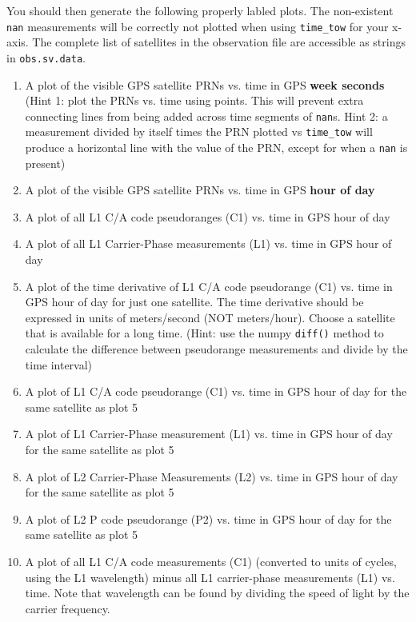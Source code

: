 \documentclass[12pt]{article}
\begin{document}
You should then generate the following properly labled plots.  The non-existent \lstinline{nan} measurements
will be correctly not plotted when using \lstinline{time_tow} for your x-axis.  The complete list
of satellites in the observation file are accessible as strings in \lstinline{obs.sv.data}.


\begin{enumerate}
   \item A plot of the visible GPS satellite PRNs vs. time in GPS \textbf{week seconds}
      (Hint 1: plot the PRNs vs. time using points.  This will prevent extra connecting lines
     from being added across time segments of \lstinline{nan}s.  Hint 2: a measurement divided by 
     itself times the PRN plotted vs \lstinline{time_tow} will produce a horizontal line with the value of
    the PRN, except for when a \lstinline{nan} is present)
   \item A plot of the visible GPS satellite PRNs vs. time in GPS \textbf{hour of day}
   \item A plot of all L1 C/A code pseudoranges (C1) vs. time in GPS hour of day
   \item A plot of all L1 Carrier-Phase measurements (L1) vs. time in GPS hour
      of day
   \item A plot of the time derivative of L1 C/A code pseudorange (C1) vs. time
      in GPS hour of day for just one satellite.  The time derivative should be
      expressed in units of meters/second (NOT meters/hour).  Choose a satellite
      that is available for a long time.  (Hint: use the numpy \lstinline{diff()} method
      to calculate the difference between pseudorange measurements and divide by the time interval)
   \item A plot of L1 C/A code pseudorange (C1) vs. time in GPS hour of day for
      the same satellite as plot 5
   \item A plot of L1 Carrier-Phase measurement (L1) vs. time in GPS hour of day
      for the same satellite as plot 5
   \item A plot of L2 Carrier-Phase Measurements (L2) vs. time in GPS hour of
      day for the same satellite as plot 5
   \item A plot of L2 P code pseudorange (P2) vs. time in GPS hour of day for
      the same satellite as plot 5
   \item A plot of all L1 C/A code measurements (C1) (converted to units of cycles,
      using the L1 wavelength) minus all L1 carrier-phase measurements (L1) vs.
      time.  Note that wavelength can be found by dividing the speed of light by
      the carrier frequency.
\end{enumerate}
\end{document}
